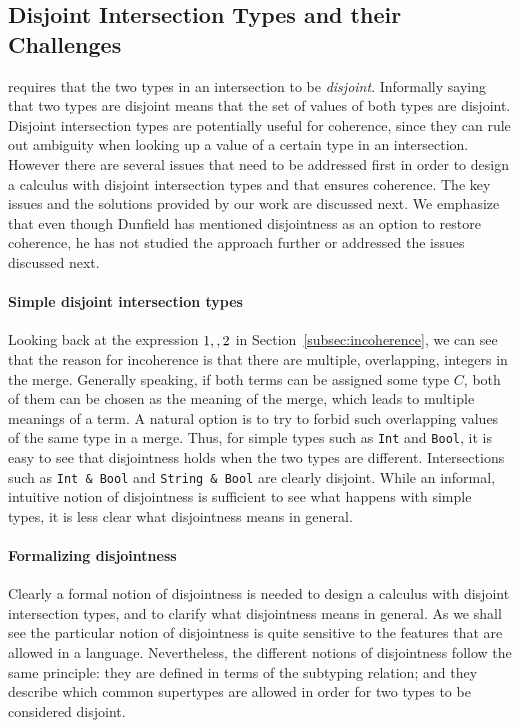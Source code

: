 \subsection{Disjoint Intersection Types and their Challenges}\label{subsec:challenges}
\name requires that the
two types in an intersection to be \emph{disjoint}.
Informally saying that two types are disjoint means that the set of
values of both types are disjoint. Disjoint intersection types are
potentially useful for coherence, since they can rule out ambiguity
when looking up a value of a certain type in an intersection. However
there are several issues that need to be addressed first in order to
design a calculus with disjoint intersection types and that ensures
coherence. The key issues and the solutions provided by our work are
discussed next. We emphasize that even though Dunfield
has mentioned disjointness as an option to restore coherence, he
has not studied the approach further or addressed the issues discussed next.

\paragraph{Simple disjoint intersection types}
Looking back at the expression $1 ,, 2$ in
Section~\ref{subsec:incoherence}, we can see that the reason for
incoherence is that there are multiple, overlapping, integers in the
merge. Generally speaking, if both terms can be assigned some type
$C$, both of them can be chosen as the meaning of the merge, which
leads to multiple meanings of a term. A natural option is to try
to forbid such overlapping values of the same type in a merge.
Thus, for simple types such as \lstinline$Int$ and \lstinline$Bool$, it is
easy to see that disjointness holds when the two types are
different. Intersections such as \lstinline$Int & Bool$ and 
\lstinline$String & Bool$ are clearly disjoint.
While an informal, intuitive notion of disjointness is sufficient to
see what happens with simple types, it is less clear what
disjointness means in general.

\paragraph{Formalizing disjointness} 
Clearly a formal notion of disjointness is needed to design a
calculus with disjoint intersection types, and to clarify what
disjointness means in general.
As we shall see the particular notion of disjointness is quite
sensitive to the features that are allowed in a language.
Nevertheless, the different notions of disjointness follow the same
principle: they are defined in terms of the subtyping relation; 
and they describe which common supertypes are allowed in order for 
two types to be considered disjoint.

